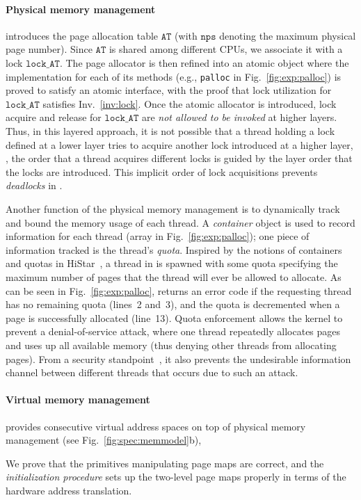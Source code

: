 \paragraph{Physical memory management}
\label{sec:base:memm}
introduces the page allocation table $\texttt{AT}$ (with
$\texttt{nps}$ denoting the maximum physical page number).  Since
$\texttt{AT}$ is shared among different CPUs, we associate it with a
lock $\texttt{lock\_AT}$.  The page allocator is then refined into an
atomic object where the implementation for each of its methods (e.g.,
\texttt{palloc} in Fig.~\ref{fig:exp:palloc}) is proved to satisfy an
atomic interface, with the proof that lock utilization for
$\texttt{lock\_AT}$ satisfies Inv.~\ref{inv:lock}.  Once the atomic
allocator is introduced, lock acquire and release for
$\texttt{lock\_AT}$ are \emph{not allowed to be invoked} at higher
layers.  Thus, in this layered approach, it is not possible that a
thread holding a lock defined at a lower layer tries to acquire
another lock introduced at a higher layer, \ie, the order that a
thread acquires different locks is guided by the layer order that the
locks are introduced.  This implicit order of lock acquisitions
prevents \emph{deadlocks} in {\mCTOS}.

Another function of the physical memory management is to dynamically
track and bound the memory usage of each thread. A \emph{container}
object is used to record information for each thread (array 
in Fig.~\ref{fig:exp:palloc}); one piece of information tracked is the
thread's \emph{quota}. Inspired by the notions of containers and
quotas in HiStar~\cite{zeldovich06}, a thread in {\mCTOS} is spawned
with some quota specifying the maximum number of pages that the thread
will ever be allowed to allocate. As can be seen in
Fig.~\ref{fig:exp:palloc},  returns an error code if the
requesting thread has no remaining quota (lines~2 and~3), and the
quota is decremented when a page is successfully allocated (line~13).
Quota enforcement allows the kernel to prevent a denial-of-service
attack, where one thread repeatedly allocates pages and uses up all
available memory (thus denying other threads from allocating
pages). From a security standpoint~\cite{costanzo16}, it also
prevents the undesirable information channel between different threads
that occurs due to such an attack.

\vspace*{-10pt}
\paragraph{Virtual memory management}
provides consecutive virtual address spaces on top of physical memory
management (see Fig.~\ref{fig:spec:memmodel}b),
  We prove that the primitives 
manipulating page maps are correct, and 
the \emph{initialization procedure} sets up the two-level page
maps properly in terms of the hardware address translation.

